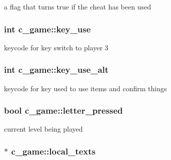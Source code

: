 a flag that turns true if the cheat has been used \hypertarget{classc__game_a43bdbd6b68af28861616fc6170be737d}{
\subsubsection[{key\-\_\-use}]{\setlength{\rightskip}{0pt plus 5cm}int c\-\_\-game\-::key\-\_\-use\hspace{0.3cm}{\ttfamily [protected]}}}\label{classc__game_a43bdbd6b68af28861616fc6170be737d}
keycode for key switch to player 3 \hypertarget{classc__game_a21fa6c7c14ef10dc9a02cc9d37142861}{
\subsubsection[{key\-\_\-use\-\_\-alt}]{\setlength{\rightskip}{0pt plus 5cm}int c\-\_\-game\-::key\-\_\-use\-\_\-alt\hspace{0.3cm}{\ttfamily [protected]}}}\label{classc__game_a21fa6c7c14ef10dc9a02cc9d37142861}
keycode for key used to use items and confirm things \hypertarget{classc__game_acb143b7fb56f8be0caf0826f4865aee8}{
\subsubsection[{letter\-\_\-pressed}]{\setlength{\rightskip}{0pt plus 5cm}bool c\-\_\-game\-::letter\-\_\-pressed\hspace{0.3cm}{\ttfamily [protected]}}}\label{classc__game_acb143b7fb56f8be0caf0826f4865aee8}
current level being played \hypertarget{classc__game_ae4e944fab107e1aa58676c40684ef634}{
\subsubsection[{local\-\_\-texts}]{$\ast$ c\-\_\-game\-::local\-\_\-texts\hspace{0.3cm}{\ttfamily [protected]}}}\label{classc__game_ae4e944fab107e1aa58676c40684ef634}
